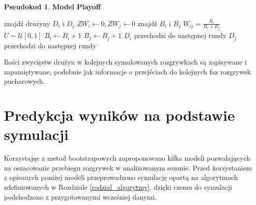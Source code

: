 \documentclass[inzynierska]{pwr_wmat_praca_dyplomowa}
\theoremstyle{plain}
\numberwithin{theorem}{chapter}
\theoremstyle{definition}
\numberwithin{theorem}{chapter}
\newtheorem{pseudokod}[theorem]{Pseudokod}
\begin{document}
\begin{pseudokod} 
	\textbf{Model Playoff}
	\begin{algorithmic}[1]
		\State znajdź drużyny $D_i$ i $D_j$
		\State $ZW_i\gets 0,ZW_j\gets 0$
		\State znajdź $B_{i}$ i $B_{j}$ 
		\State $W_{ij}=\frac{B_i}{B_i + B_j}$
		\State $U\sim \mathcal{U}[0,1]$
		\State $B_i \gets B_i+1$
		\Else
		\State $B_j \gets B_j+1$
		\EndIf
		\EndWhile
		\State $D_i$ przechodzi do następnej rundy
		\Else
		\State $D_j$ przechodzi do następnej rundy
		\EndIf
	\end{algorithmic}
\end{pseudokod}

Ilości zwycięstw drużyn w kolejnych symulowanych rozgrywkach są zapisywane i zapamiętywane, podobnie jak informacje o przejściach do kolejnych faz rozgrywek pucharowych. 

\section{Predykcja wyników na podstawie symulacji}
Korzystając z metod bootstrapowych zaproponowano kilka modeli pozwalających na oszacowanie przebiegu rozgrywek w analizowanym sezonie.
Przed korzystaniem z opisanych poniżej modeli przeprowadzono symulację opartą na algorytmach zdefiniowanych w Rozdziale \ref{rodzial_algorytmy}, dzięki czemu do symulacji podchodzono z przygotowanymi wcześniej danymi.
\end{document}
